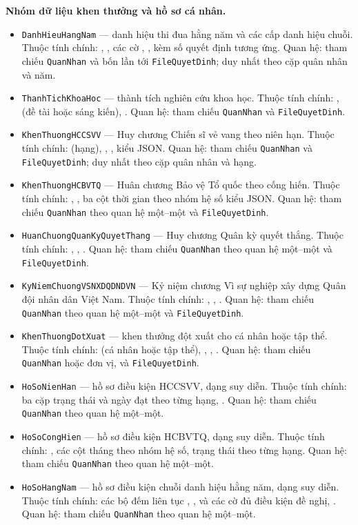 \documentclass[../DoAn.tex]{subfiles}
\begin{document}
\textbf{Nhóm dữ liệu khen thưởng và hồ sơ cá nhân.}
\begin{itemize}
    \item \texttt{DanhHieuHangNam} --- danh hiệu thi đua hằng năm và các cấp danh hiệu chuỗi. Thuộc tính chính: , , các cờ , ,  kèm số quyết định tương ứng. Quan hệ: tham chiếu \texttt{QuanNhan} và bốn lần tới \texttt{FileQuyetDinh}; duy nhất theo cặp quân nhân và năm.
    \item \texttt{ThanhTichKhoaHoc} --- thành tích nghiên cứu khoa học. Thuộc tính chính: ,  (đề tài hoặc sáng kiến), . Quan hệ: tham chiếu \texttt{QuanNhan} và \texttt{FileQuyetDinh}.
    \item \texttt{KhenThuongHCCSVV} --- Huy chương Chiến sĩ vẻ vang theo niên hạn. Thuộc tính chính:  (hạng), , ,  kiểu JSON. Quan hệ: tham chiếu \texttt{QuanNhan} và \texttt{FileQuyetDinh}; duy nhất theo cặp quân nhân và hạng.
    \item \texttt{KhenThuongHCBVTQ} --- Huân chương Bảo vệ Tổ quốc theo cống hiến. Thuộc tính chính: , , ba cột thời gian theo nhóm hệ số kiểu JSON. Quan hệ: tham chiếu \texttt{QuanNhan} theo quan hệ một--một và \texttt{FileQuyetDinh}.
    \item \texttt{HuanChuongQuanKyQuyetThang} --- Huy chương Quân kỳ quyết thắng. Thuộc tính chính: , , . Quan hệ: tham chiếu \texttt{QuanNhan} theo quan hệ một--một và \texttt{FileQuyetDinh}.
    \item \texttt{KyNiemChuongVSNXDQDNDVN} --- Kỷ niệm chương Vì sự nghiệp xây dựng Quân đội nhân dân Việt Nam. Thuộc tính chính: , , . Quan hệ: tham chiếu \texttt{QuanNhan} theo quan hệ một--một và \texttt{FileQuyetDinh}.
    \item \texttt{KhenThuongDotXuat} --- khen thưởng đột xuất cho cá nhân hoặc tập thể. Thuộc tính chính:  (cá nhân hoặc tập thể), , , . Quan hệ: tham chiếu \texttt{QuanNhan} hoặc đơn vị, và \texttt{FileQuyetDinh}.
    \item \texttt{HoSoNienHan} --- hồ sơ điều kiện HCCSVV, dạng suy diễn. Thuộc tính chính: ba cặp trạng thái và ngày đạt theo từng hạng, . Quan hệ: tham chiếu \texttt{QuanNhan} theo quan hệ một--một.
    \item \texttt{HoSoCongHien} --- hồ sơ điều kiện HCBVTQ, dạng suy diễn. Thuộc tính chính: , các cột tháng theo nhóm hệ số, trạng thái theo từng hạng. Quan hệ: tham chiếu \texttt{QuanNhan} theo quan hệ một--một.
    \item \texttt{HoSoHangNam} --- hồ sơ điều kiện chuỗi danh hiệu hằng năm, dạng suy diễn. Thuộc tính chính: các bộ đếm liên tục , ,  và các cờ đủ điều kiện đề nghị, . Quan hệ: tham chiếu \texttt{QuanNhan} theo quan hệ một--một.
\end{itemize}
\end{document}
